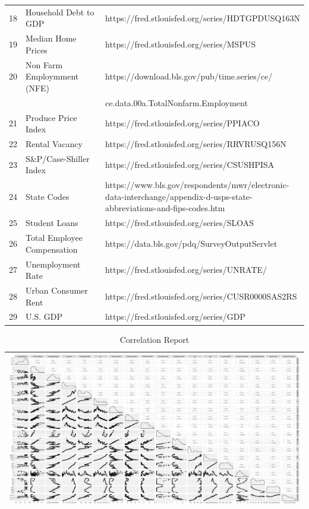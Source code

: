 \documentclass[sigconf,nonacm,11pt]{acmart}
\begin{document}
\begin{appendix}
\begin{table}[ht]
\begin{tabular}{p{0.05\linewidth}p{0.35\linewidth}p{0.6\linewidth}}
18 & Household Debt to GDP & https://fred.stlouisfed.org/series/HDTGPDUSQ163N\\
19 & Median Home Prices & https://fred.stlouisfed.org/series/MSPUS\\
20 & Non Farm Employmment (NFE) & https://download.bls.gov/pub/time.series/ce/\\
 & & ce.data.00a.TotalNonfarm.Employment\\
21 & Produce Price Index  & https://fred.stlouisfed.org/series/PPIACO\\
22 & Rental Vacancy & https://fred.stlouisfed.org/series/RRVRUSQ156N\\
23 & S\&P/Case-Shiller Index & https://fred.stlouisfed.org/series/CSUSHPISA\\
24 & State Codes & https://www.bls.gov/respondents/mwr/electronic-data-interchange/appendix-d-usps-state-abbreviations-and-fips-codes.htm\\
25 & Student Loans & https://fred.stlouisfed.org/series/SLOAS\\
26 & Total Employee Compensation & https://data.bls.gov/pdq/SurveyOutputServlet\\
27 & Unemployment Rate & https://fred.stlouisfed.org/series/UNRATE/\\
28 & Urban Consumer Rent & https://fred.stlouisfed.org/series/CUSR0000SAS2RS\\
29 & U.S. GDP  & https://fred.stlouisfed.org/series/GDP\\
\hline
\end{tabular}
\end{table}




\begin{table}[ht]
\caption{Correlation Report}
\centering
\begin{tabular}{p{1.0\linewidth}}
\hline
\includegraphics[scale = 0.27]{teamfedcorrelation.png}\\
\hline
\end{tabular}
\end{table}



\end{appendix}
\end{document}
